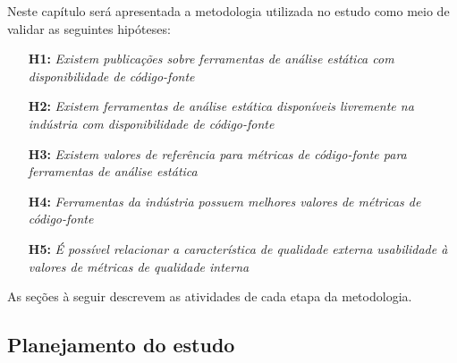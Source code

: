 \documentclass[12pt]{article}
\begin{document}
%
%

Neste capítulo será apresentada a metodologia utilizada no estudo como meio
de validar as seguintes hipóteses:

\begin{enumerate}
  \item[{\bf H1:}] {\em Existem publicações sobre ferramentas de análise
    estática com disponibilidade de código-fonte}
  \item[{\bf H2:}] {\em Existem ferramentas de análise estática disponíveis
    livremente na indústria com disponibilidade de código-fonte}
  \item[{\bf H3:}] {\em Existem valores de referência para métricas de
    código-fonte para ferramentas de análise estática}
  \item[{\bf H4:}] {\em Ferramentas da indústria possuem melhores valores de
    métricas de código-fonte}
  \item[{\bf H5:}] {\em É possível relacionar a característica de qualidade
    externa usabilidade à valores de métricas de qualidade interna}
\end{enumerate}

As seções à seguir descrevem as atividades de cada etapa da metodologia.

\subsection{Planejamento do estudo}
\end{document}
